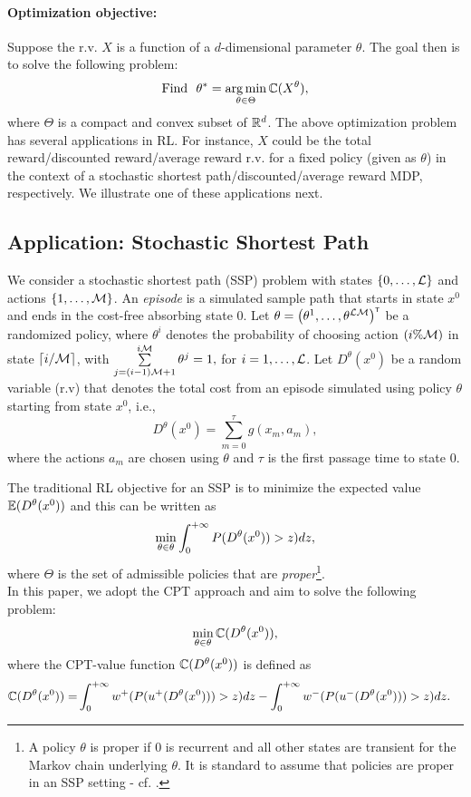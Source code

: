 \documentclass[11pt,letterpaper,english]{article}
\begin{document}
\paragraph{Optimization objective:} Suppose the r.v. $X$ is a function of a $d$-dimensional parameter $\theta$. The goal then is to solve the following problem:
\begin{align}
\label{eq:opt-general}
\textrm{Find ~}\theta^* = \mathop{\rm arg\,min}_{\theta \in \Theta} \mathbb{C}(X^\theta),
\end{align}
where $\Theta$ is a compact and convex subset of $\mathbb{R}^d$.
The above optimization problem has several applications in RL. For instance, $X$ could be the total reward/discounted reward/average reward r.v. for a fixed policy (given as $\theta$) in the context of a stochastic shortest path/discounted/average reward MDP, respectively. We illustrate one of these applications next.

\subsection{Application: Stochastic Shortest Path}
We consider a stochastic shortest path (SSP) problem with states $\{0,\ldots,\mathcal{L}\}$ and actions $\{1,\ldots,\mathcal{M}\}$. 
An \textit{episode} is a simulated sample path that starts in state $x^0$ and ends in the cost-free absorbing state $0$. 
Let $\theta=\left(\theta^{1},\ldots,\theta^{\mathcal{L}\mathcal{M}}\right)^\mathsf{\scriptscriptstyle T}$ be a randomized policy, where $\theta^{i}$ denotes the probability of choosing action $(i\% \mathcal{M})$ in state $\left \lceil{i/\mathcal{M}}\right \rceil$, with $\sum\limits_{j=(i-1)\mathcal{M}+1}^{i\mathcal{M}} \theta^{j} = 1,$ for $i=1,\ldots,\mathcal{L}$. 
Let $D^\theta(x^0)$ be a random variable (r.v) that denotes the total cost from an episode simulated using policy $\theta$ starting from state $x^0$, i.e.,
$$ D^\theta(x^0) = \sum\limits_{m=0}^{\tau} g(x_m,a_m), $$
where the actions $a_m$ are chosen using  $\theta$ and
$\tau$ is the first passage time to state $0$. 

The traditional RL objective for an SSP is to minimize the expected value $\mathbb{E} (D^\theta(x^0))$ and this can be written as
$$\min_{\theta\in\theta} \int_0^{+\infty} P(D^\theta(x^0))>z) dz,$$ where $\Theta$ is the set of admissible policies that are \textit{proper}\footnote{A policy $\theta$ is proper if $0$ is recurrent and all other states are transient for the Markov chain underlying $\theta$. It is standard to assume that policies are proper in an SSP setting - cf. \cite{bertsekas1995dynamic}.}.\\
In this paper, we adopt the CPT approach and aim to solve the following problem: 
$$ \min_{\theta \in \theta} \mathbb{C}(D^\theta(x^0)),$$
where the CPT-value function $\mathbb{C}(D^\theta(x^0))$ is defined as
\begin{align}
\mathbb{C}(D^\theta(x^0)) = &\int_0^{+\infty} w^+(P(u^+(D^\theta(x^0)))>z) dz - \int_0^{+\infty} w^-(P(u^-(D^\theta(x^0)))>z) dz. \label{eq:cpt-mdp}
\end{align}
\end{document}
